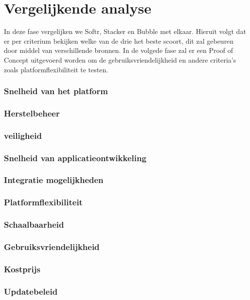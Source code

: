 \section*{Vergelijkende analyse}
\label{sec:vergelijkende-analyse} 
In deze fase vergelijken we Softr, Stacker en Bubble met elkaar.
Hieruit volgt dat er per criterium bekijken welke van de drie het beste scoort, dit zal gebeuren door middel van verschillende bronnen.
In de volgede fase zal er een Proof of Concept uitgevoerd worden om de gebruiksvriendelijkheid en andere criteria's zoals platformflexibiliteit te testen.

\subsubsection*{Snelheid van het platform}
\subsubsection*{Herstelbeheer}
\subsubsection*{veiligheid}
\subsubsection*{Snelheid van applicatieontwikkeling}
\subsubsection*{Integratie mogelijkheden}
\subsubsection*{Platformflexibiliteit}
\subsubsection*{Schaalbaarheid}
\subsubsection*{Gebruiksvriendelijkheid}
\subsubsection*{Kostprijs}
\subsubsection*{Updatebeleid}



